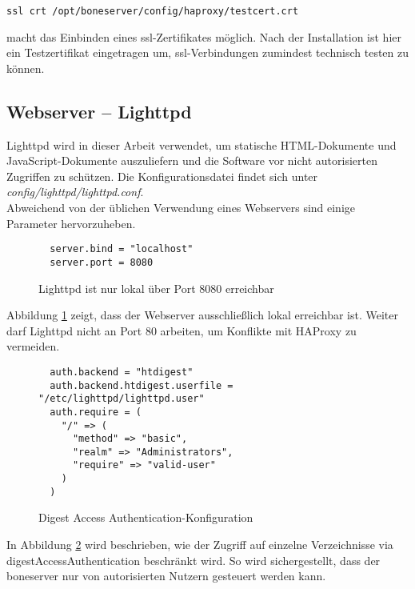 \begin{lstlisting}
ssl crt /opt/boneserver/config/haproxy/testcert.crt
\end{lstlisting}
macht das Einbinden eines \gls{ssl}-Zertifikates möglich. Nach der Installation ist hier ein Testzertifikat eingetragen um, \gls{ssl}-Verbindungen zumindest technisch testen zu können.


\subsection{Webserver -- Lighttpd}
\label{subsec:Lighttpd}
Lighttpd wird in dieser Arbeit verwendet, um statische HTML-Dokumente und JavaScript-Dokumente auszuliefern und die Software vor nicht autorisierten Zugriffen zu schützen. Die Konfigurationsdatei findet sich unter \textit{config/lighttpd/lighttpd.conf}.\\

Abweichend von der üblichen Verwendung eines Webservers sind einige Parameter hervorzuheben.

\begin{figure}[ht]
  \begin{lstlisting}
  server.bind = "localhost"
  server.port = 8080
  \end{lstlisting}
  \caption{Lighttpd ist nur lokal über Port 8080 erreichbar}
  \label{lst:lighttpdLocal}
\end{figure}

Abbildung \ref{lst:lighttpdLocal} zeigt, dass der Webserver ausschließlich lokal erreichbar ist. Weiter darf Lighttpd nicht an Port 80 arbeiten, um Konflikte mit HAProxy zu vermeiden.\\

\begin{figure}[ht]
  \begin{lstlisting}
  auth.backend = "htdigest"
  auth.backend.htdigest.userfile = "/etc/lighttpd/lighttpd.user"
  auth.require = (
    "/" => (
      "method" => "basic",
      "realm" => "Administrators",
      "require" => "valid-user"
    )
  )
  \end{lstlisting}
  \caption{Digest Access Authentication-Konfiguration}
  \label{lst:lighttpdhtdigest}
\end{figure}

In Abbildung \ref{lst:lighttpdhtdigest} wird beschrieben, wie der Zugriff auf einzelne Verzeichnisse via \gls{digestAccessAuthentication} beschränkt wird. So wird sichergestellt, dass der boneserver nur von autorisierten Nutzern gesteuert werden kann.

